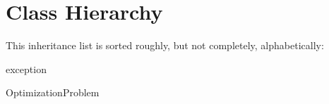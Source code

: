 \section{Class Hierarchy}
This inheritance list is sorted roughly, but not completely, alphabetically\-:\begin{DoxyCompactList}
\item {}
\item exception\begin{DoxyCompactList}
\item {}
\end{DoxyCompactList}
\item Optimization\-Problem\begin{DoxyCompactList}
\item {}
\end{DoxyCompactList}
\end{DoxyCompactList}
